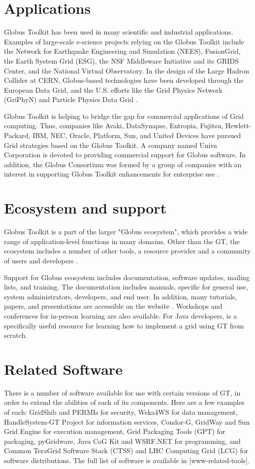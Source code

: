 \documentclass[9pt,twocolumn,twoside]{../../styles/osajnl}
\begin{document}
\section{Applications}
Globus Toolkit has been used in many scientific and industrial applications. Examples of large-scale e-science projects relying on the Globus Toolkit include the Network for Earthquake Engineering and Simulation (NEES), FusionGrid, the Earth System Grid (ESG), the NSF Middleware Initiative and its GRIDS Center, and the National Virtual Observatory. In the design of the Large Hadron Collider at CERN, Globus-based technologies have been developed through the European Data Grid, and the U.S. efforts like the Grid Physics Network (GriPhyN) and Particle Physics Data Grid \cite{www-about-globus}.

Globus Toolkit is helping to bridge the gap for commercial applications of Grid computing. Thus, companies like Avaki, DataSynapse, Entropia, Fujitsu, Hewlett-Packard, IBM, NEC, Oracle, Platform, Sun, and United Devices have pursued Grid strategies based on the Globus Toolkit. 
A company named Univa Corporation is devoted to providing commercial support for Globus software. In addition, the Globus Consortium was formed by a group of companies with an interest in supporting Globus Toolkit enhancements for enterprise use \cite{www-about-globus}.

\section{Ecosystem and support}
Globus Toolkit is a part of the larger "Globus ecosystem", which provides a wide range of application-level functions in many domains. Other than the GT, the ecosystem includes a number of other tools, a resource provider and a community of users and developers \cite{foster2006globus}.

Support for Globus ecosystem includes documentation, software updates, mailing lists, and training. The documentation includes manuals, specific for general use, system administrators, developers, and end user. In addition, many tutorials, papers, and presentations are accessible on the website \cite{www-globus-tutorial}. Workshops and conferences for in-person learning are also available. For Java developers, \cite{sotomayor2006globus} is a specifically useful resource for learning how to implement a grid using GT from scratch.

\section{Related Software}
There is a number of software available for use with certain versions of GT, in order to extend the abilities of each of its components. Here are a few examples of each: GridShib and PERMIs for security, Weka4WS for data management, HandleSystem-GT Project for information services, Condor-G, GridWay and Sun Grid Engine for execution management, Grid Packaging Tools (GPT) for packaging, pyGridware, Java CoG Kit and WSRF.NET for programming, and Common TeraGrid Software Stack (CTSS) and LHC Computing Grid (LCG) for software distributions. The full list of software is available in [www-related-tools].
\end{document}
